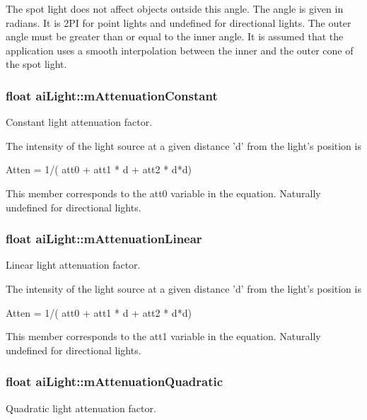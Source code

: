 \-The spot light does not affect objects outside this angle. \-The angle is given in radians. \-It is 2\-P\-I for point lights and undefined for directional lights. \-The outer angle must be greater than or equal to the inner angle. \-It is assumed that the application uses a smooth interpolation between the inner and the outer cone of the spot light. \hypertarget{structaiLight_ae8804b3c309527ca0f85d676bab55710}{
\subsubsection[{m\-Attenuation\-Constant}]{\setlength{\rightskip}{0pt plus 5cm}float {\bf ai\-Light\-::m\-Attenuation\-Constant}}}\label{structaiLight_ae8804b3c309527ca0f85d676bab55710}
\-Constant light attenuation factor.

\-The intensity of the light source at a given distance 'd' from the light's position is 
\begin{DoxyCode}
  Atten = 1/( att0 + att1 * d + att2 * d*d)
\end{DoxyCode}
 \-This member corresponds to the att0 variable in the equation. \-Naturally undefined for directional lights. \hypertarget{structaiLight_aefda311eaa785ea345782dfa95be817c}{
\subsubsection[{m\-Attenuation\-Linear}]{\setlength{\rightskip}{0pt plus 5cm}float {\bf ai\-Light\-::m\-Attenuation\-Linear}}}\label{structaiLight_aefda311eaa785ea345782dfa95be817c}
\-Linear light attenuation factor.

\-The intensity of the light source at a given distance 'd' from the light's position is 
\begin{DoxyCode}
  Atten = 1/( att0 + att1 * d + att2 * d*d)
\end{DoxyCode}
 \-This member corresponds to the att1 variable in the equation. \-Naturally undefined for directional lights. \hypertarget{structaiLight_ab4fb07bfa40a807661b1ed1791838a6d}{
\subsubsection[{m\-Attenuation\-Quadratic}]{\setlength{\rightskip}{0pt plus 5cm}float {\bf ai\-Light\-::m\-Attenuation\-Quadratic}}}\label{structaiLight_ab4fb07bfa40a807661b1ed1791838a6d}
\-Quadratic light attenuation factor.

